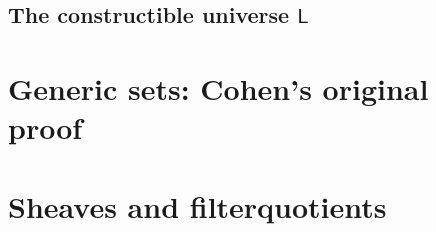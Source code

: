 \documentclass[11pt]{article}
\newcommand{\bval}{\msf{.bval}}
\newcommand{\func}{\msf{.func}}
\newcommand{\type}{\msf{.type}}
\begin{document}










\subsection{The constructible universe $\mathsf{L}$}

\section{Generic sets: Cohen's original proof}

\section{Sheaves and filterquotients}
\end{document}
